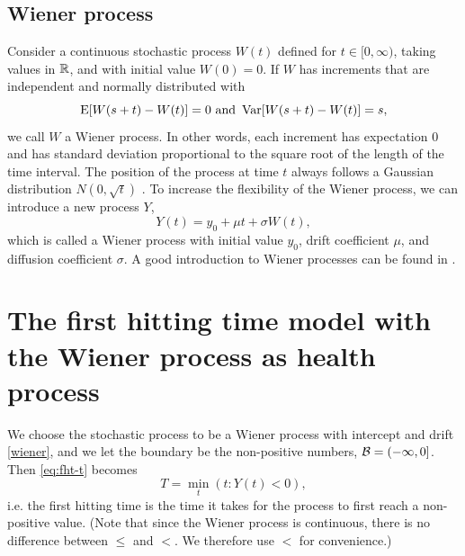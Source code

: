 \subsection{Wiener process}\label{subsec:wiener}
Consider a continuous stochastic process $W(t)$ defined for $t\in[0,\infty)$, taking values in $\mathbb{R}$, and with initial value $W(0)=0$. If $W$ has increments that are independent and normally distributed with
\begin{equation*}
    \operatorname{E}[W(s+t)-W(t)]=0\text{   and   }\operatorname{Var}[W(s+t)-W(t)]=s,
\end{equation*}
we call $W$ a Wiener process.
In other words, each increment has expectation 0 and has standard deviation proportional to the square root of the length of the time interval.
The position of the process at time $t$ always follows a Gaussian distribution $N(0, \sqrt{t})$ \citep{ABG}.
To increase the flexibility of the Wiener process, we can introduce a new process $Y$,
\begin{equation}\label{wiener}
    Y(t)=y_0+\mu t+\sigma W(t),
\end{equation}
which is called a Wiener process with initial value $y_0$, drift coefficient $\mu$, and diffusion coefficient $\sigma$.
A good introduction to Wiener processes can be found in \citet{cox1965}.

\section{The first hitting time model with the Wiener process as health process}
We choose the stochastic process to be a Wiener process with intercept and drift \eqref{wiener}, and we let the boundary be the non-positive numbers, $\mathcal{B}=(-\infty,0]$.
Then \eqref{eq:fht-t} becomes
\begin{equation*}
    T=\min_t\left(t\colon Y(t)<0\right),
\end{equation*}
i.e. the first hitting time is the time it takes for the process to first reach a non-positive value.
(Note that since the Wiener process is continuous, there is no difference between $\leq$ and $<$. We therefore use $<$ for convenience.)

